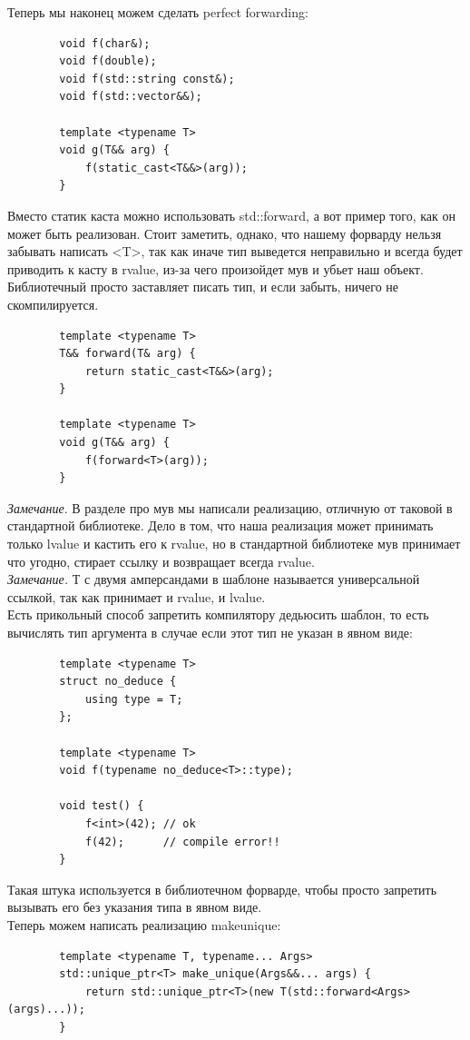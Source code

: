 \documentclass[12pt, a4paper]{article}
\begin{document}
	Теперь мы наконец можем сделать perfect forwarding:
	\begin{verbatim}
		void f(char&);
		void f(double);
		void f(std::string const&);
		void f(std::vector&&);
		
		template <typename T>
		void g(T&& arg) {
			f(static_cast<T&&>(arg));
		}
	\end{verbatim}
	Вместо статик каста можно использовать std::forward, а вот пример того, как он может быть реализован. Стоит заметить, однако, что нашему форварду нельзя забывать написать <T>, так как иначе тип выведется неправильно и всегда будет приводить к касту в rvalue, из-за чего произойдет мув и убьет наш объект. Библиотечный просто заставляет писать тип, и если забыть, ничего не скомпилируется.
	\begin{verbatim}
		template <typename T>
		T&& forward(T& arg) {
			return static_cast<T&&>(arg);
		}
		
		template <typename T>
		void g(T&& arg) {
			f(forward<T>(arg));
		}
	\end{verbatim}
	\textit{Замечание}. В разделе про мув мы написали реализацию, отличную от таковой в стандартной библиотеке. Дело в том, что наша реализация может принимать только lvalue и кастить его к rvalue, но в стандартной библиотеке мув принимает что угодно, стирает ссылку и возвращает всегда rvalue.\\
	\textit{Замечание.} Т с двумя амперсандами в шаблоне называется универсальной ссылкой, так как принимает и rvalue, и lvalue.\\
	Есть прикольный способ запретить компилятору дедьюсить шаблон, то есть вычислять тип аргумента в случае если этот тип не указан в явном виде:
	\begin{verbatim}
		template <typename T>
		struct no_deduce {
			using type = T;
		};
		
		template <typename T>
		void f(typename no_deduce<T>::type);
		
		void test() {
			f<int>(42); // ok
			f(42);      // compile error!!
		}
	\end{verbatim}
	Такая штука используется в библиотечном форварде, чтобы просто запретить вызывать его без указания типа в явном виде.\\
	Теперь можем написать реализацию make\textunderscore unique:
	\begin{verbatim}
		template <typename T, typename... Args>
		std::unique_ptr<T> make_unique(Args&&... args) {
			return std::unique_ptr<T>(new T(std::forward<Args>(args)...));
		}
	\end{verbatim}
\end{document}
